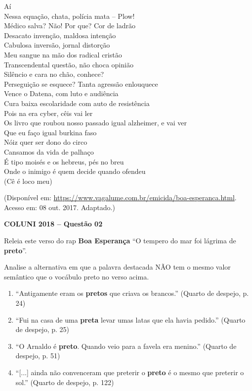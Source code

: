 \noindent
Aí\\
Nessa equação, chata, polícia mata -- Plow!\\
Médico salva? Não! Por que? Cor de ladrão\\
Desacato invenção, maldosa intenção\\
Cabulosa inversão, jornal distorção\\
Meu sangue na mão dos radical cristão\\
Transcendental questão, não choca opinião\\
Silêncio e cara no chão, conhece?\\
Perseguição se esquece? Tanta agressão enlouquece\\
Vence o Datena, com luto e audiência\\
Cura baixa escolaridade com auto de resistência\\
Pois na era cyber, cêis vai ler\\
Os livro que roubou nosso passado igual alzheimer, e vai ver\\
Que eu faço igual burkina faso\\
Nóiz quer ser dono do circo\\
Cansamos da vida de palhaço\\
É tipo moisés e os hebreus, pés no breu\\
Onde o inimigo é quem decide quando ofendeu\\
(Cê é loco meu)\\
[...]

\vspace{0.3cm}

\begin{center}
\footnotesize
(Disponível em: \url{https://www.vagalume.com.br/emicida/boa-esperanca.html}.
Acesso em: 08 out. 2017. Adaptado.)
\end{center}

\textbf{COLUNI 2018 -- Questão 02}\par\medskip Releia este verso do rap \textbf{Boa Esperança} “O tempero do mar foi lágrima de \textbf{preto}”.

\par

Analise a alternativa em que a palavra destacada NÃO tem o mesmo valor semântico que o vocábulo preto no verso acima.\begin{enumerate}
\item “Antigamente eram os \textbf{pretos} que criava os brancos.” (Quarto de despejo, p. 24)
\item “Fui na casa de uma \textbf{preta} levar umas latas que ela havia pedido.” (Quarto de despejo, p. 25)
\item “O Arnaldo é \textbf{preto}. Quando veio para a favela era menino.” (Quarto de despejo, p. 51)
\item “[...] ainda não convenceram que preterir o \textbf{preto} é o mesmo que preterir o sol.” (Quarto de despejo, p. 122)\end{enumerate}
